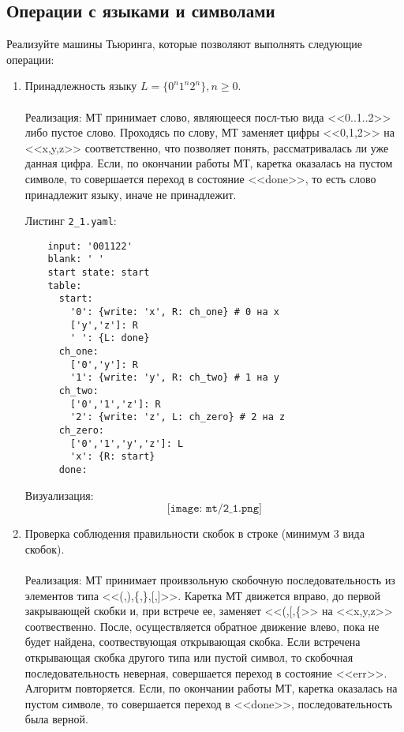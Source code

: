 \documentclass[a4paper, 12pt] {article} %
\begin{document}
\subsection{Операции с языками и символами}
Реализуйте машины Тьюринга, которые позволяют выполнять следующие операции:

\begin{enumerate}
    \item Принадлежность языку $L = \{0^n1^n2^n\},n\ge 0$. 
    \\ \\
    Реализация: 
    МТ принимает слово, являющееся посл-тью вида <<0..1..2>> либо пустое слово. Проходясь по слову, МТ заменяет цифры <<0,1,2>> на <<x,y,z>> соответственно, что позволяет понять, рассматривалась ли уже данная цифра. Если, по окончании работы МТ, каретка оказалась на пустом символе, то совершается переход в состояние <<done>>, то есть слово принадлежит языку, иначе не принадлежит. 
    
    Листинг \texttt{2_1.yaml}:
    \begin{verbatim}
    input: '001122'
    blank: ' '
    start state: start
    table:
      start:
        '0': {write: 'x', R: ch_one} # 0 на х
        ['y','z']: R
        ' ': {L: done}
      ch_one:
        ['0','y']: R
        '1': {write: 'y', R: ch_two} # 1 на y
      ch_two:
        ['0','1','z']: R
        '2': {write: 'z', L: ch_zero} # 2 на z
      ch_zero:
        ['0','1','y','z']: L
        'x': {R: start}
      done:
    \end{verbatim}
    
    Визуализация:
    \[\texttt{[image: mt/2\_1.png]}\]
    
    \item Проверка соблюдения правильности скобок в строке (минимум 3 вида скобок).
    \\ \\
    Реализация: 
    МТ принимает проивзольную скобочную последовательность из элементов типа <<(,),\{,\},[,]>>. Каретка МТ движется вправо, до первой закрывающей скобки и, при встрече ее, заменяет <<(,[,\{>> на <<x,y,z>> соотвественно. После, осуществляется обратное движение влево, пока не будет найдена, соотвествующая открывающая скобка. Если встречена открывающая скобка другого типа или пустой символ, то скобочная последовательность неверная, совершается переход в состояние <<err>>. Алгоритм повторяется. Если, по окончании работы МТ, каретка оказалась на пустом символе, то совершается переход в <<done>>, последовательность была верной. 
    

\end{enumerate}
\end{document}
